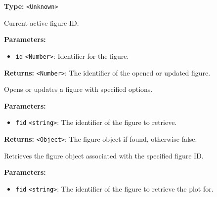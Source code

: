 \documentclass[12pt,a4paper]{article}
\begin{document}
\vspace{5mm}
\noindent {}\vspace{4mm}


\noindent \textbf{Type:} \texttt{<Unknown>}

\noindent Current active figure ID.

\vspace{5mm}
\noindent {}


\noindent \textbf{Parameters:}
\begin{itemize}
  \item \texttt{id} \texttt{<Number>}: Identifier for the figure.
\end{itemize}

\noindent \textbf{Returns:} \texttt{<Number>}: The identifier of the opened or updated figure.

\noindent Opens or updates a figure with specified options.

\vspace{5mm}
\noindent {}


\noindent \textbf{Parameters:}
\begin{itemize}
  \item \texttt{fid} \texttt{<string>}: The identifier of the figure to retrieve.
\end{itemize}

\noindent \textbf{Returns:} \texttt{<Object>}: The figure object if found, otherwise \textasciigrave{}false\textasciigrave{}.

\noindent Retrieves the figure object associated with the specified figure ID.

\vspace{5mm}
\noindent {}


\noindent \textbf{Parameters:}
\begin{itemize}
  \item \texttt{fid} \texttt{<string>}: The identifier of the figure to retrieve the plot for.
\end{itemize}
\end{document}
